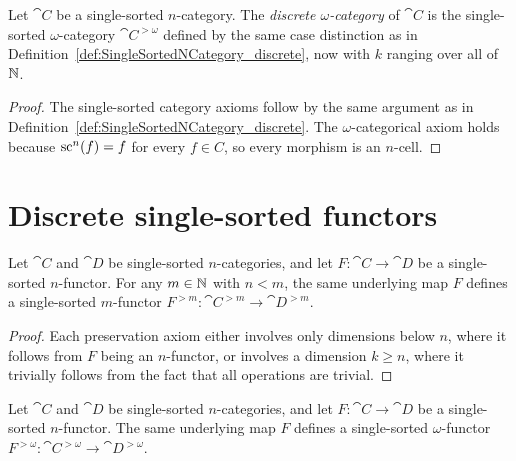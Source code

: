 \begin{construction}
  \label{def:SingleSortedNCategory_discreteOmega}
  \leanok
  Let $\cat{C}$ be a single-sorted $n$-category. The \emph{discrete $\omega$-category} of $\cat{C}$
  is the single-sorted $\omega$-category $\cat{C}^{>\omega}$ defined by the same case distinction as
  in Definition~\ref{def:SingleSortedNCategory_discrete}, now with $k$ ranging over all of $\mathbb{N}$.
\end{construction}

\begin{proof}
  \leanok
  The single-sorted category axioms follow by the same argument as in
  Definition~\ref{def:SingleSortedNCategory_discrete}. The $\omega$-categorical axiom holds because
  $\operatorname{sc}^n (f) = f$ for every $f \in C$, so every morphism is an $n$-cell.
\end{proof}

\section{Discrete single-sorted functors}

\begin{construction}
  \label{def:SingleSortedNFunctor_discrete}
  \leanok
  Let $\cat{C}$ and $\cat{D}$ be single-sorted $n$-categories, and let $F \colon \cat{C} \to
  \cat{D}$ be a single-sorted $n$-functor. For any $m \in \mathbb{N}$ with $n < m$, the same underlying map
  $F$ defines a single-sorted $m$-functor $F^{>m} \colon \cat{C}^{>m} \to \cat{D}^{>m}$.
\end{construction}

\begin{proof}
  \leanok
  Each preservation axiom either involves only dimensions below $n$, where it follows from $F$ being
  an $n$-functor, or involves a dimension $k \geq n$, where it trivially follows from the fact that
  all operations are trivial.
\end{proof}

\begin{construction}
  \label{def:SingleSortedNFunctor_discreteOmega}
  \leanok
  Let $\cat{C}$ and $\cat{D}$ be single-sorted $n$-categories, and let $F \colon \cat{C} \to
  \cat{D}$ be a single-sorted $n$-functor. The same underlying map $F$ defines a single-sorted
  $\omega$-functor $F^{>\omega} \colon \cat{C}^{>\omega} \to \cat{D}^{>\omega}$.
\end{construction}

